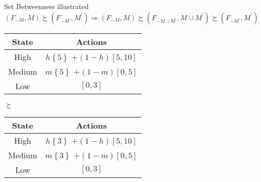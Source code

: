 \documentclass[usenames,dvipsnames,aspectratio=169,11pt, envcountsect, handout]{beamer}
\begin{document}
\begin{frame}{Set Betweenness illustrated}
	\[
		\left( F_{-M}, M \right)  \succsim \left( F_{-M^{\prime}}, M^{\prime} \right) \Rightarrow \left( F_{-M}, M \right)  \succsim \left( F_{-M \cup M^{\prime}}, M \cup M^{\prime} \right) \succsim \left( F_{-M^{\prime}}, M^{\prime} \right)
	\]

	\vfill

	\begin{table}[H]
		\centering
		\begin{minipage}{0.45\textwidth}
			\centering
			\begin{tabular}{c | c}
				State                          & Actions                                                                                       \\
				\hline
				{\color{bleudefrance} High}    & {\color{bleudefrance}\( h \left\{ 5 \right\} \) } \(+ \left(1-h \right) \left[5,10 \right] \) \\
				{\color{bleudefrance} Medium } & {\color{bleudefrance}\( m \left\{ 5 \right\} \) } \(+ \left(1-m \right) \left[0,5 \right] \)  \\
				Low                            & \( \left[0,3 \right] \)                                                                       \\
			\end{tabular}
		\end{minipage}\hspace{0.25cm} %
		\( \succsim \) %
		\hspace{0.25cm}
		\begin{minipage}{0.45\textwidth}
			\centering
			\begin{tabular}{c | c}
				State                          & Actions                                                                                       \\
				\hline
				{\color{bleudefrance} High}    & {\color{bleudefrance}\( h \left\{ 3 \right\} \) } \(+ \left(1-h \right) \left[5,10 \right] \) \\
				{\color{bleudefrance} Medium } & {\color{bleudefrance}\( m \left\{ 3 \right\} \) } \(+ \left(1-m \right) \left[0,5 \right] \)  \\
				Low                            & \( \left[0,3 \right] \)                                                                       \\

\end{tabular}
\end{minipage}
\end{table}
\end{frame}
\end{document}
